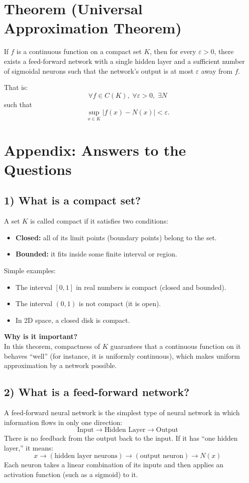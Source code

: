 \documentclass{article}
\begin{document}
\section*{Theorem (Universal Approximation Theorem)}

If \( f \) is a continuous function on a compact set \( K \), then for every \( \varepsilon > 0 \), there exists a feed-forward network with a single hidden layer and a sufficient number of sigmoidal neurons such that the network's output is at most \( \varepsilon \) away from \( f \).

That is:
\[
\forall f \in C(K), \; \forall \varepsilon > 0, \; \exists N
\]
such that
\[
\sup_{x \in K} \left| f(x) - N(x) \right| < \varepsilon.
\]

\section*{Appendix: Answers to the Questions}

\subsection*{1) What is a compact set?}
A set \( K \) is called compact if it satisfies two conditions:
\begin{itemize}
    \item \textbf{Closed:} all of its limit points (boundary points) belong to the set.
    \item \textbf{Bounded:} it fits inside some finite interval or region.
\end{itemize}

Simple examples:
\begin{itemize}
    \item The interval \( [0,1] \) in real numbers is compact (closed and bounded).
    \item The interval \( (0,1) \) is not compact (it is open).
    \item In 2D space, a closed disk is compact.
\end{itemize}

\textbf{Why is it important?} \\
In this theorem, compactness of \( K \) guarantees that a continuous function on it behaves ``well'' (for instance, it is uniformly continuous), which makes uniform approximation by a network possible.

\subsection*{2) What is a feed-forward network?}
A feed-forward neural network is the simplest type of neural network in which information flows in only one direction:
\[
\text{Input} \to \text{Hidden Layer} \to \text{Output}
\]
There is no feedback from the output back to the input. If it has ``one hidden layer,'' it means:
\[
x \to (\text{hidden layer neurons}) \to (\text{output neuron}) \to N(x)
\]
Each neuron takes a linear combination of its inputs and then applies an activation function (such as a sigmoid) to it.
\end{document}
